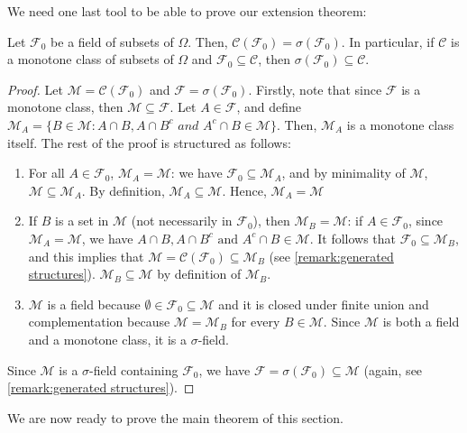 We need one last tool to be able to prove our extension theorem:
\begin{thrm}\label{theorem:Monotone Class}
Let \(\mathcal{F}_0\) be a field of subsets of \(\Omega\). Then, \(\mathcal{C}(\mathcal{F}_0)=\sigma(\mathcal{F}_0)\). In particular,
if \(\mathcal{C}\) is a monotone class of subsets of \(\Omega\) and \(\mathcal{F}_0\subseteq\mathcal{C}\),
then \(\sigma(\mathcal{F}_0)\subseteq\mathcal{C}\).
\end{thrm}
\begin{proof} Let \(\mathcal{M}=\mathcal{C}(\mathcal{F}_0)\) and \(\mathcal{F}=\sigma(\mathcal{F}_0)\). Firstly, note that since \(\mathcal{F}\) is a
monotone class, then \(\mathcal{M}\subseteq\mathcal{F}\). Let \(A\in\mathcal{F}\), and define
\(\mathcal{M}_A=\{B\in\mathcal{M}\colon A\cap B, A\cap B^c \textit{ and } A^c\cap B\in\mathcal{M}\}\).
Then, \(\mathcal{M}_A\) is a monotone class itself. The rest of the proof is structured as follows:
	\begin{enumerate}
		\item For all \(A\in\mathcal{F}_{0}\), \(\mathcal{M}_{A}=\mathcal{M}\): we have
\(\mathcal{F}_{0}\subseteq \mathcal{M}_{A}\), and by minimality of \(\mathcal{M}\), \(\mathcal{M}\subseteq\mathcal{M}_{A}\).
By definition, \(\mathcal{M}_{A}\subseteq\mathcal{M}\). Hence, \(\mathcal{M}_A=\mathcal{M}\)
\item If \(B\) is a set in \(\mathcal{M}\) (not necessarily in \(\mathcal{F}_0\)), then \(\mathcal{M}_{B}=\mathcal{M}\): if \(A\in\mathcal{F}_0\), since \(\mathcal{M}_A=\mathcal{M}\), we have \(A\cap B, A\cap B^c \text{ and }A^c\cap B\in\mathcal{M}\). It follows that \(\mathcal{F}_0\subseteq\mathcal{M}_B\), and this implies that \(\mathcal{M}=\mathcal{C}(\mathcal{F}_0)\subseteq\mathcal{M}_B\) (see \cref{remark:generated structures}). \(\mathcal{M}_B\subseteq\mathcal{M}\) by definition of \(\mathcal{M}_B\).
		\item \(\mathcal{M}\) is a field because \(\emptyset\in\mathcal{F}_0\subseteq\mathcal{M}\) and it is closed under finite union and complementation because \(\mathcal{M}=\mathcal{M}_B\) for every \(B\in\mathcal{M}\). Since \(\mathcal{M}\) is both a field and a monotone class, it is a \(\sigma\)-field.
	\end{enumerate}
	Since \(\mathcal{M}\) is a \(\sigma\)-field containing \(\mathcal{F}_0\), we have \(\mathcal{F}=\sigma(\mathcal{F}_0)\subseteq\mathcal{M}\) (again, see \cref{remark:generated structures}).
\end{proof}
We are now ready to prove the main theorem of this section.

